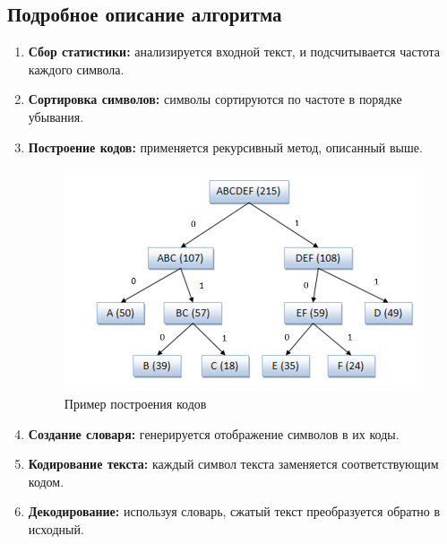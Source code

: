 \documentclass[12pt]{article}
\begin{document}
\subsection{Подробное описание алгоритма}
\begin{enumerate}
    \item \textbf{Сбор статистики:} анализируется входной текст, и подсчитывается частота каждого символа.
    \item \textbf{Сортировка символов:} символы сортируются по частоте в порядке убывания.
    \item \textbf{Построение кодов:} применяется рекурсивный метод, описанный выше.
        \begin{figure}[H]
        \centering
            \includegraphics[scale=0.5]{temp.png}
            \caption{Пример построения кодов}
        \end{figure}
         
    \item \textbf{Создание словаря:} генерируется отображение символов в их коды.
    \item \textbf{Кодирование текста:} каждый символ текста заменяется соответствующим кодом.
    \item \textbf{Декодирование:} используя словарь, сжатый текст преобразуется обратно в исходный.
\end{enumerate}
\end{document}
